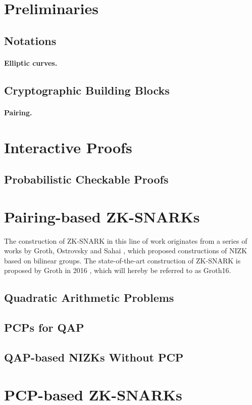 \documentclass[12pt]{article}
\theoremstyle{plain}
\theoremstyle{definition}
\theoremstyle{remark}
\begin{document}

\section{Preliminaries}

  \subsection{Notations}

   \paragraph{Elliptic curves.}

  \subsection{Cryptographic Building Blocks}

    \paragraph{Pairing.}

\section{Interactive Proofs}

  \subsection{Probabilistic Checkable Proofs}

\section{Pairing-based ZK-SNARKs}

The construction of ZK-SNARK in this line of work originates from a series of works by Groth, Ostrovsky and Sahai \cite{groth2006simulation,gos2006non,gos2006perfect}, which proposed constructions of NIZK based on bilinear groups.
The state-of-the-art construction of ZK-SNARK is proposed by Groth in 2016 \cite{groth2016size}, which will hereby be referred to as Groth16.

\subsection{Quadratic Arithmetic Problems}

\subsection{PCPs for QAP}

\subsection{QAP-based NIZKs Without PCP}

\section{PCP-based ZK-SNARKs}



\end{document}
